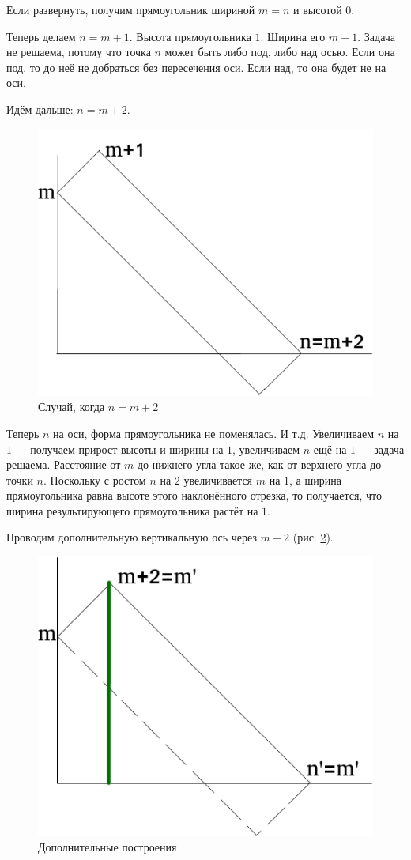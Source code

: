 \documentclass{book}
\begin{document}
Если развернуть, получим прямоугольник шириной $m = n$ и высотой $0$.

Теперь делаем $n = m + 1$.
Высота прямоугольника $1$.
Ширина его $m + 1$.
Задача не решаема, потому что точка $n$ может быть либо под, либо над осью.
Если она под, то до неё не добраться без пересечения оси.
Если над, то она будет не на оси.

Идём дальше: $n = m + 2$.

\begin{figure}[h!]
  \centering
  \includegraphics[width=.6\textwidth]{./pictures/4_22_6.png}
  \caption{Случай, когда $n = m + 2$}
  \label{fig:4226}
\end{figure}

Теперь $n$ на оси, форма прямоугольника не поменялась.
И т.д.
Увеличиваем $n$ на $1$ --- получаем прирост высоты и ширины на $1$, увеличиваем $n$ ещё на $1$ --- задача решаема.
Расстояние от $m$ до нижнего угла такое же, как от верхнего угла до точки $n$.
Поскольку с ростом $n$ на $2$ увеличивается $m$ на $1$, а ширина прямоугольника равна высоте этого наклонённого отрезка, то получается, что ширина результирующего прямоугольника растёт на $1$.

Проводим дополнительную вертикальную ось через $m + 2$ (рис. \ref{fig:4227}).

\begin{figure}[h!]
  \centering
  \includegraphics[width=.6\textwidth]{./pictures/4_22_7.png}
  \caption{Дополнительные построения}
  \label{fig:4227}
\end{figure}
\end{document}
